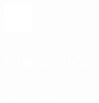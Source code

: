 \documentclass[../main.tex]{subfiles}
\begin{document}
    \hspace*{0.2cm}
    \begin{minipage}[t]{2cm}
        \vspace*{0.75cm}\includegraphics[width=1.5cm]{assets/location.png}
    \end{minipage}
    \begin{minipage}[t]{5cm}

        \vspace*{0.65cm}
        \section*{\textcolor{white}{DIRECCIÓN}}
        \vspace*{-0.25cm}
        \textcolor{white}{
            Mataró, 08301 \\
            Barcelona, España
        }
    \end{minipage}
\end{document}
